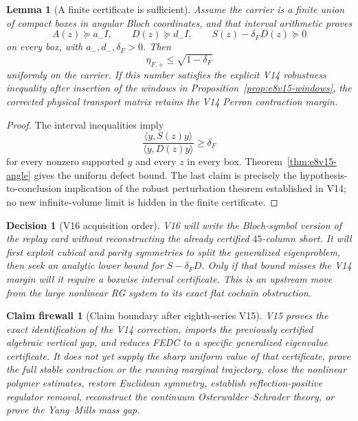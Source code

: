 \documentclass[11pt,oneside]{book}
\newtheorem{lemma}[theorem]{Lemma}
\newtheorem{firewall}[theorem]{Claim firewall}
\newtheorem{decision}[theorem]{Decision}
\theoremstyle{definition}
\theoremstyle{remark}
\begin{document}
\begin{lemma}[A finite certificate is sufficient]
\label{lem:e8v15-certificate}
Assume the carrier is a finite union of compact boxes in angular Bloch
coordinates, and that interval arithmetic proves
\[
 A(z)\succeq a_-I,\qquad D(z)\succeq d_-I,\qquad
 S(z)-\delta_FD(z)\succeq0
\]
on every box, with \(a_-,d_-,\delta_F>0\).  Then
\[
             \eta_{F,+}\leq\sqrt{1-\delta_F}
\]
uniformly on the carrier.  If this number satisfies the explicit V14
robustness inequality after insertion of the windows in
Proposition~\ref{prop:e8v15-windows}, the corrected physical transport
matrix retains the V14 Perron contraction margin.
\end{lemma}

\begin{proof}
The interval inequalities imply
\[
\frac{\langle y,S(z)y\rangle}{\langle y,D(z)y\rangle}
\geq\delta_F
\]
for every nonzero supported \(y\) and every \(z\) in every box.
Theorem~\ref{thm:e8v15-angle} gives the uniform defect bound.  The last
claim is precisely the hypothesis-to-conclusion implication of the
robust perturbation theorem established in V14; no new infinite-volume
limit is hidden in the finite certificate.
\end{proof}

\begin{decision}[V16 acquisition order]
\label{dec:e8v15-v16}
V16 will write the Bloch-symbol version of the replay card without
reconstructing the already certified \(45\)-column short.  It will
first exploit cubical and parity symmetries to split the generalized
eigenproblem, then seek an analytic lower bound for
\(S-\delta_FD\).  Only if that bound misses the V14 margin will it
require a boxwise interval certificate.  This is an upstream move from
the large nonlinear RG system to its exact flat cochain obstruction.
\end{decision}

\begin{firewall}[Claim boundary after eighth-series V15]
\label{fire:e8v15-claim}
V15 proves the exact identification of the V14 correction, imports the
previously certified algebraic vertical gap, and reduces FEDC to a
specific generalized eigenvalue certificate.  It does not yet supply
the sharp uniform value of that certificate, prove the full stable
contraction or the running marginal trajectory, close the nonlinear
polymer estimates, restore Euclidean symmetry, establish
reflection-positive regulator removal, reconstruct the continuum
Osterwalder--Schrader theory, or prove the Yang--Mills mass gap.
\end{firewall}
\end{document}
